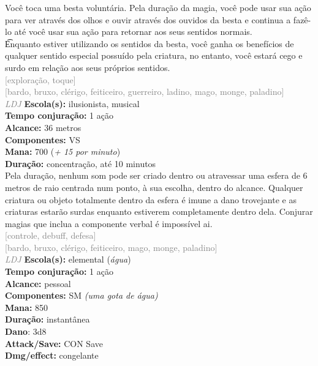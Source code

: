 \documentclass{RPG_Adventure}[2021/10/20]
\begin{document}
{\normalsize Você toca uma besta voluntária. Pela duração da magia, você pode usar sua ação para ver através dos olhos e ouvir através dos ouvidos da besta e continua a fazê-lo até você usar sua ação para retornar aos seus sentidos normais.\\\t Enquanto estiver utilizando os sentidos da besta, você ganha os benefícios de qualquer sentido especial possuído pela criatura, no entanto, você estará cego e surdo em relação aos seus próprios sentidos.\\}
{\scriptsize \textcolor{gray}{[exploração, toque]\\}}
{\scriptsize \textcolor{gray}{[bardo, bruxo, clérigo, feiticeiro, guerreiro, ladino, mago, monge, paladino]\\}}
{\tiny \textcolor{gray}{\textit{LDJ}}}
{\small \t \textbf{Escola(s):} ilusionista, musical\\\t \textbf{Tempo conjuração:} 1 ação\\\t \textbf{Alcance:} 36 metros\\\t \textbf{Componentes:} VS\\\t \textbf{Mana:} 700 (\textit{+ 15 por minuto})\\\t \textbf{Duração:} concentração, até 10 minutos\\}
{\normalsize Pela duração, nenhum som pode ser criado dentro ou atravessar uma esfera de 6 metros de raio centrada num ponto, à sua escolha, dentro do alcance. Qualquer criatura ou objeto totalmente dentro da esfera é imune a dano trovejante e as criaturas estarão surdas enquanto estiverem completamente dentro dela. Conjurar magias que inclua a componente verbal é impossível ai.\\}
{\scriptsize \textcolor{gray}{[controle, debuff, defesa]\\}}
{\scriptsize \textcolor{gray}{[bardo, bruxo, clérigo, feiticeiro, mago, monge, paladino]\\}}
{\tiny \textcolor{gray}{\textit{LDJ}}}
{\small \t \textbf{Escola(s):} elemental (\textit{água})\\\t \textbf{Tempo conjuração:} 1 ação\\\t \textbf{Alcance:} pessoal\\\t \textbf{Componentes:} SM \textit{(uma gota de água)}\\\t \textbf{Mana:} 850\\\t \textbf{Duração:} instantânea\\\t \textbf{Dano}: 3d8\\\t \textbf{Attack/Save:} CON Save\\\t \textbf{Dmg/effect:} congelante\\}
\end{document}
